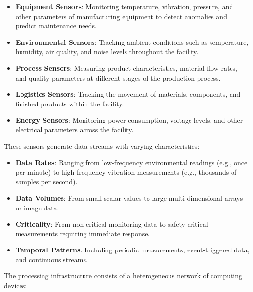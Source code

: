 \documentclass{article}
\begin{document}
\begin{itemize}
    \item \textbf{Equipment Sensors}: Monitoring temperature, vibration, pressure, and other parameters of manufacturing equipment to detect anomalies and predict maintenance needs.
    
    \item \textbf{Environmental Sensors}: Tracking ambient conditions such as temperature, humidity, air quality, and noise levels throughout the facility.
    
    \item \textbf{Process Sensors}: Measuring product characteristics, material flow rates, and quality parameters at different stages of the production process.
    
    \item \textbf{Logistics Sensors}: Tracking the movement of materials, components, and finished products within the facility.
    
    \item \textbf{Energy Sensors}: Monitoring power consumption, voltage levels, and other electrical parameters across the facility.
\end{itemize}

These sensors generate data streams with varying characteristics:

\begin{itemize}
    \item \textbf{Data Rates}: Ranging from low-frequency environmental readings (e.g., once per minute) to high-frequency vibration measurements (e.g., thousands of samples per second).
    
    \item \textbf{Data Volumes}: From small scalar values to large multi-dimensional arrays or image data.
    
    \item \textbf{Criticality}: From non-critical monitoring data to safety-critical measurements requiring immediate response.
    
    \item \textbf{Temporal Patterns}: Including periodic measurements, event-triggered data, and continuous streams.
\end{itemize}

The processing infrastructure consists of a heterogeneous network of computing devices:
\end{document}
